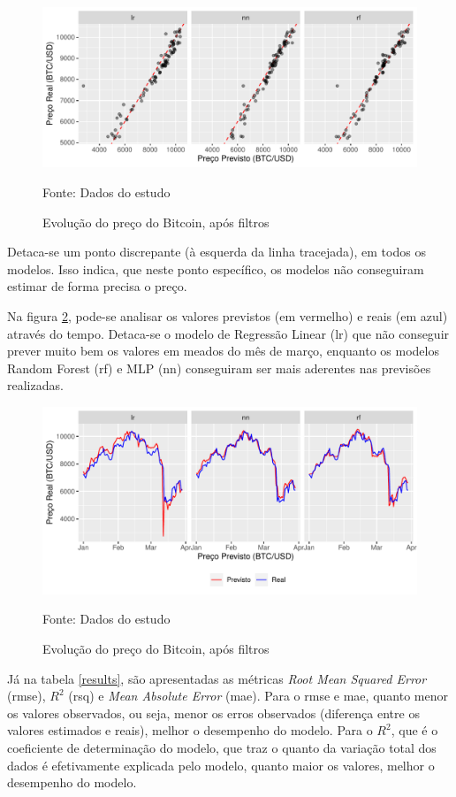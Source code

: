 \documentclass[12pt]{article}
\begin{document}
\begin{figure}[!ht]
  \centering
  \includegraphics[scale = 0.8]{img/results_scatter.pdf}
  \caption{Evolução do preço do Bitcoin, após filtros}
  Fonte: Dados do estudo
  \label{fig:results_scatter}
\end{figure}

Detaca-se um ponto discrepante (à esquerda da linha tracejada), em todos os modelos.
Isso indica, que neste ponto específico, os modelos não conseguiram estimar de forma
precisa o preço.


Na figura \ref{fig:results_line}, pode-se analisar os valores previstos (em vermelho)
e reais (em azul) através do tempo. Detaca-se o modelo de Regressão Linear (lr)
que não conseguir prever muito bem os valores em meados do mês de março, enquanto
os modelos Random Forest (rf) e MLP (nn) conseguiram ser mais aderentes nas 
previsões realizadas.

\begin{figure}[!ht]
  \centering
  \includegraphics[scale = 0.8]{img/results_line.pdf}
  \caption{Evolução do preço do Bitcoin, após filtros}
  Fonte: Dados do estudo
  \label{fig:results_line}
\end{figure}

Já na tabela \ref{results}, são apresentadas as métricas \textit{Root Mean 
Squared Error} (rmse), $R^{2}$ (rsq) e \textit{Mean Absolute Error} (mae). Para o 
rmse e mae, quanto menor os valores observados, ou seja, menor os erros 
observados (diferença entre os valores estimados e reais), melhor o desempenho
do modelo. Para o $R^{2}$, que é o coeficiente de determinação do modelo, que 
traz o quanto da variação total dos dados é efetivamente explicada pelo modelo, 
quanto maior os valores, melhor o desempenho do modelo.
\end{document}

